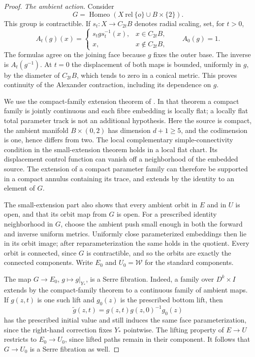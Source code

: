 \begin{proof}
\emph{The ambient action.}
Consider
\[
 G=\operatorname{Homeo}
       (X\ \mathrm{rel}\ \{o\}\cup B\times\{2\}).
\]
This group is contractible.  If $s_t:X\to C_{2t}B$ denotes radial
scaling, set, for $t>0$,
\[
 A_t(g)(x)=
 \begin{cases}
  s_tg s_t^{-1}(x),&x\in C_{2t}B,\\
  x,&x\notin C_{2t}B,
 \end{cases}
 \qquad A_0(g)=1.
\]
The formulas agree on the joining face because $g$ fixes the outer
base.  The inverse is $A_t(g^{-1})$.
At $t=0$ the displacement of both maps is bounded, uniformly in
$g$, by the diameter of $C_{2t}B$, which tends to zero in a conical
metric.  This proves continuity of the Alexander contraction,
including its dependence on $g$.

We use the compact-family extension theorem of
\cite[Theorem~1, pp.~1247--1248; covering-isotopy theorem,
p.~1250]{Chernavskii1969}.
In that theorem a compact family is jointly continuous and each
fibre embedding is locally flat; a locally flat total parameter
track is not an additional hypothesis.
Here the source is compact, the ambient manifold $B\times(0,2)$
has dimension $d+1\geq5$, and the codimension is one, hence differs
from two.  The local complementary simple-connectivity condition
in the small-extension theorem holds in a local flat chart.
Its displacement control function can vanish off a neighborhood
of the embedded source.  The extension of a compact parameter
family can therefore be supported in a compact annulus containing
its trace, and extends by the identity to an element of $G$.

The small-extension part also shows that every ambient orbit in
$E$ and in $U$ is open, and that its orbit map from $G$ is open.
For a prescribed identity neighborhood in $G$, choose the ambient
push small enough in both the forward and inverse uniform metrics.
Uniformly close parameterized embeddings then lie in its orbit
image; after reparameterization the same holds in the quotient.
Every orbit is connected, since $G$ is contractible, and so the
orbits are exactly the connected components.
Write $E_0$ and $U_0=\mathcal W$ for the standard components.

The map $G\to E_0$, $g\mapsto g|_{Y_*}$, is a Serre fibration.
Indeed, a family over $D^k\times I$ extends by the compact-family
theorem to a continuous family of ambient maps.  If $g(z,t)$ is
one such lift and $g_0(z)$ is the prescribed bottom lift, then
\[
 \widetilde g(z,t)=g(z,t)g(z,0)^{-1}g_0(z)
\]
has the prescribed initial value and still induces the same face
parameterization, since the right-hand correction fixes $Y_*$
pointwise.  The lifting property of $E\to U$ restricts to
$E_0\to U_0$, since lifted paths remain in their component.
It follows that $G\to U_0$ is a Serre fibration as well.


\end{proof}
